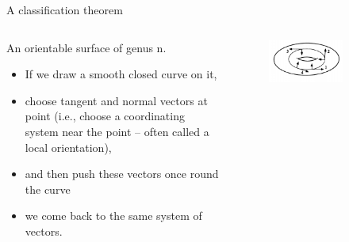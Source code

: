 \documentclass{beamer}
\begin{document}
\begin{frame}{A classification theorem}
  \begin{columns}
    \begin{column}{0.6\textwidth}
      \begin{block}{}
        An orientable surface of genus n.
        \begin{itemize}
        \item If we draw a smooth closed curve on it,
        \item choose tangent and normal vectors at point (i.e., choose a coordinating system near the point -- often called a local orientation),
        \item and then push these vectors once round the curve
        \item we come back to the same system of vectors.
        \end{itemize}
      \end{block}
    \end{column}
    \begin{column}{0.4\textwidth}
      \begin{figure}
        \centering
        \includegraphics[width=0.7\textwidth]{figure_1_19_a.png}
        \caption{}
      \end{figure}
    \end{column}
  \end{columns}
\end{frame}
\end{document}
